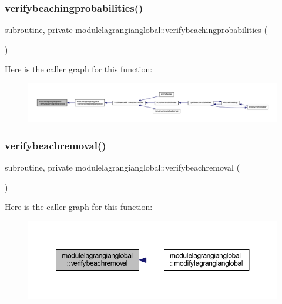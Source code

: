 \subsubsection{\texorpdfstring{verifybeachingprobabilities()}{verifybeachingprobabilities()}}
{\footnotesize\ttfamily subroutine, private modulelagrangianglobal\+::verifybeachingprobabilities (\begin{DoxyParamCaption}{ }\end{DoxyParamCaption})\hspace{0.3cm}{\ttfamily [private]}}

Here is the caller graph for this function\+:\nopagebreak
\begin{figure}[H]
\begin{center}
\leavevmode
\includegraphics[width=350pt]{namespacemodulelagrangianglobal_aee31fff31d61d2bd1593396996588917_icgraph}
\end{center}
\end{figure}
\mbox{\label{namespacemodulelagrangianglobal_aa5dd026eab84c8d529a778738099f2a9}} 
\subsubsection{\texorpdfstring{verifybeachremoval()}{verifybeachremoval()}}
{\footnotesize\ttfamily subroutine, private modulelagrangianglobal\+::verifybeachremoval (\begin{DoxyParamCaption}{ }\end{DoxyParamCaption})\hspace{0.3cm}{\ttfamily [private]}}

Here is the caller graph for this function\+:\nopagebreak
\begin{figure}[H]
\begin{center}
\leavevmode
\includegraphics[width=350pt]{namespacemodulelagrangianglobal_aa5dd026eab84c8d529a778738099f2a9_icgraph}
\end{center}
\end{figure}
\mbox{\label{namespacemodulelagrangianglobal_ac2e61e57ce9a9bd0aef7e60998c77a7b}} 
